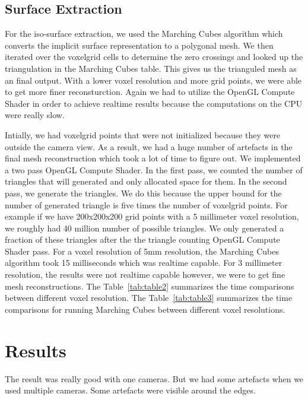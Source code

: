 \documentclass[10pt,twocolumn,letterpaper]{article}
\begin{document}
\subsection{Surface Extraction}
For the iso-surface extraction, we used the Marching Cubes algorithm which converts the implicit surface representation to a polygonal mesh. We then iterated over the voxelgrid cells to determine the zero crossings and looked up the triangulation in the Marching Cubes table. This gives us the trianguled mesh as an final output. With a lower voxel resolution and more grid points, we were able to get more finer reconsturction. Again we had to utilize the OpenGL Compute Shader in order to achieve realtime results because the computations on the CPU were really slow.

Intially, we had voxelgrid points that were not initialized because they were outside the camera view. As a result, we had a huge number of artefacts in the final mesh reconstruction which took a lot of time to figure out. We implemented a two pass OpenGL Compute Shader. In the first pass, we counted the number of triangles that will generated and only allocated space for them. In the second pass, we generate the triangles. We do this because the upper bound for the number of generated triangle is five times the number of voxelgrid points. For example if we have 200x200x200 grid points with a 5 millimeter voxel resolution, we roughly had 40 million number of possible triangles. We only generated a fraction of these triangles after the the triangle counting OpenGL Compute Shader pass. For a voxel resolution of 5mm resolution, the Marching Cubes algorithm took 15 milliseconds which was realtime capable. For 3 millimeter resolution, the results were not realtime capable however, we were to get fine mesh reconstructions.  The Table~\ref{tab:table2} summarizes the time comparisons between different voxel resolution. The Table~\ref{tab:table3} summarizes the time comparisons for running Marching Cubes between different voxel resolutions. 

\section{Results}
The result was really good with one cameras. But we had some artefacts when we used multiple cameras. Some artefacts were visible around the edges.
\end{document}
